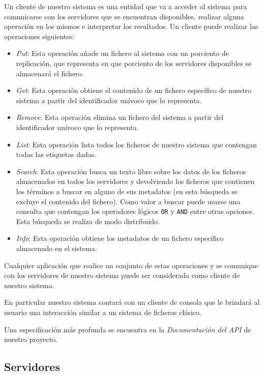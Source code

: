 \documentclass{article}
\begin{document}
Un cliente de nuestro sistema es una entidad que va a acceder al sistema para
comunicarse con los servidores que se encuentran disponibles, realizar alguna
operación en los mismos e interpretar los resultados. Un cliente puede realizar
las operaciones siguientes:

\begin{itemize}
  \item \emph{Put}: Esta operación añade un fichero al sistema con
  un porciento de replicación, que representa en que porciento de los
  servidores disponibles se almacenará el fichero.
  \item \emph{Get}: Esta operación obtiene el contenido de un fichero específico
  de nuestro sistema a partir del identificador unívoco que lo representa.
  \item \emph{Remove}: Esta operación elimina un fichero del sistema a partir
  del identificador unívoco que lo representa.
  \item \emph{List}: Esta operación lista todos los ficheros de nuestro sistema
  que contengan todas las etiquetas dadas.
  \item \emph{Search}: Esta operación busca un texto libre sobre los datos
  de los ficheros almacenados en todos los servidores y devolviendo los
  ficheros que contienen los términos a buscar en alguno de sus metadatos (en
  esta búsqueda se excluye el contenido del fichero). Como valor a buscar puede
  usarse una consulta que contengan los operadores lógicos \verb|OR| y
  \verb|AND| entre otras opciones. Esta búsqueda se realiza de modo
  distribuido.
  \item \emph{Info}: Esta operación obtiene los metadatos de un fichero
  específico almacenado en el sistema.
\end{itemize}

Cualquier aplicación que realice un conjunto de estas operaciones y se
comunique con los servidores de nuestro sistema puede ser considerada como
cliente de nuestro sistema.

En particular nuestro sistema contará con un cliente de consola que le brindará
al usuario una interacción similar a un sistema de ficheros clásico.

Una especificación más profunda se encuentra en la \emph{Documentación del API}
de nuestro proyecto.

\subsection{Servidores}
\end{document}
